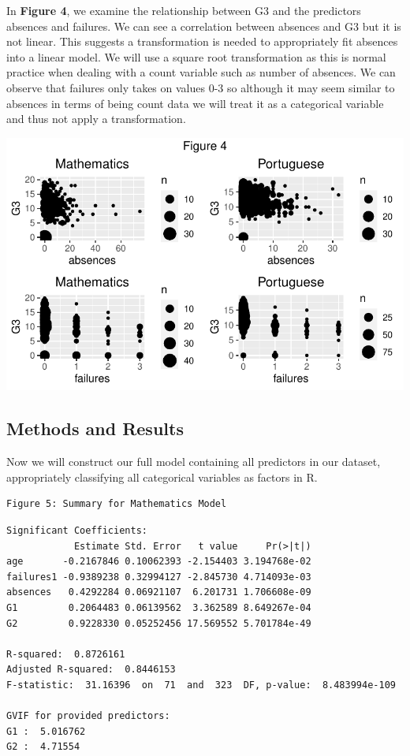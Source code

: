 \documentclass[
  letterpaper,
  DIV=11,
  numbers=noendperiod]{scrartcl}
\begin{document}
In \textbf{Figure 4}, we examine the relationship between G3 and the
predictors absences and failures. We can see a correlation between
absences and G3 but it is not linear. This suggests a transformation is
needed to appropriately fit absences into a linear model. We will use a
square root transformation as this is normal practice when dealing with
a count variable such as number of absences. We can observe that
failures only takes on values 0-3 so although it may seem similar to
absences in terms of being count data we will treat it as a categorical
variable and thus not apply a transformation.

\includegraphics{Final_Paper_edit_files/figure-pdf/unnamed-chunk-3-1.pdf}

\subsection{Methods and Results}\label{methods-and-results}

Now we will construct our full model containing all predictors in our
dataset, appropriately classifying all categorical variables as factors
in R.

\begin{verbatim}
Figure 5: Summary for Mathematics Model 
\end{verbatim}

\begin{verbatim}
Significant Coefficients:
            Estimate Std. Error   t value     Pr(>|t|)
age       -0.2167846 0.10062393 -2.154403 3.194768e-02
failures1 -0.9389238 0.32994127 -2.845730 4.714093e-03
absences   0.4292284 0.06921107  6.201731 1.706608e-09
G1         0.2064483 0.06139562  3.362589 8.649267e-04
G2         0.9228330 0.05252456 17.569552 5.701784e-49

R-squared:  0.8726161 
Adjusted R-squared:  0.8446153 
F-statistic:  31.16396  on  71  and  323  DF, p-value:  8.483994e-109 

GVIF for provided predictors:
G1 :  5.016762 
G2 :  4.71554 
\end{verbatim}
\end{document}
